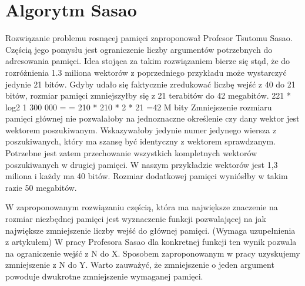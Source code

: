 \section{Algorytm Sasao}
Rozwiązanie problemu rosnącej pamięci zaproponował Profesor Tsutomu Sasao.
Częścią jego pomysłu jest ograniczenie liczby argumentów potrzebnych do adresowania pamięci.
Idea stojąca za takim rozwiązaniem bierze się stąd, że do rozróżnienia 1.3 miliona wektorów z poprzedniego przykładu może wystarczyć jedynie 21 bitów.
Gdyby udało się faktycznie zredukować liczbę wejść z 40 do 21 bitów, rozmiar pamięci zmniejszyłby się z 21 terabitów do 42 megabitów.
221 * log2 1 300 000 =
= 210 * 210 * 2 * 21 =42 M bity
Zmniejszenie rozmiaru pamięci głównej nie pozwalałoby na jednoznaczne określenie czy dany wektor jest wektorem poszukiwanym.
Wskazywałoby jedynie numer jedynego wiersza z poszukiwanych, który ma szansę być identyczny z wektorem sprawdzanym.
Potrzebne jest zatem przechowanie wszystkich kompletnych wektorów poszukiwanych w drugiej pamięci.
W naszym przykładzie wektorów jest 1,3 miliona i każdy ma 40 bitów.
Rozmiar dodatkowej pamięci wyniósłby w takim razie 50 megabitów.

W zaproponowanym rozwiązaniu częścią, która ma największe znaczenie na rozmiar niezbędnej pamięci jest wyznaczenie funkcji pozwalającej na jak największe zmniejszenie liczby wejść do głównej pamięci.
(Wymaga uzupełnienia z artykułem) W pracy Profesora Sasao dla konkretnej funkcji ten wynik pozwala na ograniczenie wejść z N do X.
Sposobem zaproponowanym w pracy uzyskujemy zmniejszenie z N do Y.
Warto zauważyć, że zmniejszenie o jeden argument powoduje dwukrotne zmniejszenie wymaganej pamięci.
